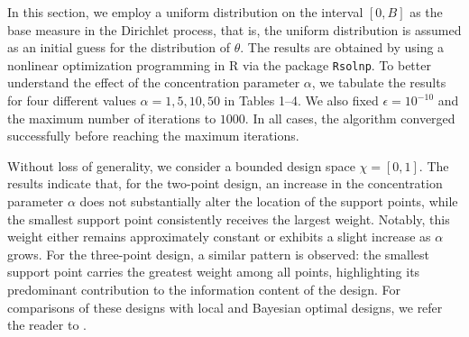 \documentclass[twoside]{article}
\begin{document}
In this section, we employ a uniform distribution on the interval $[0, B]$ as the base measure in the Dirichlet process, that is, the uniform distribution is assumed as an initial guess for the distribution of $\theta$. The results are obtained by using a nonlinear optimization programming in R via the package \texttt{Rsolnp}. To better understand the effect of the concentration parameter $\alpha$, we tabulate the results for four different values $\alpha = 1, 5, 10, 50$ in Tables 1–4. We also fixed $\epsilon = 10^{-10}$ and the maximum number of iterations to $1000$. In all cases, the algorithm converged successfully before reaching the maximum iterations. 

Without loss of generality, we consider a bounded design space $\chi = [0, 1]$. The results indicate that, for the two-point design, an increase in the concentration parameter $\alpha$ does not substantially alter the location of the support points, while the smallest support point consistently receives the largest weight. Notably, this weight either remains approximately constant or exhibits a slight increase as $\alpha$ grows. For the three-point design, a similar pattern is observed: the smallest support point carries the greatest weight among all points, highlighting its predominant contribution to the information content of the design. For comparisons of these designs with local and Bayesian optimal designs, we refer the reader to \cite{Abdollahi:2023, Abdollahi:2024, Abdollahi:2025, Nanvapisheh:2024, Nanvapisheh:2025}.
\end{document}
